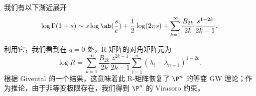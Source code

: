 \begin{lem}
    我们有以下渐近展开
    \[ \log \Gamma(1+s) \sim s \log \ab(\frac{s}{e}) + \frac{1}{2} \log(2\pi s) + \sum_{k=1}^{\infty} \frac{B_{2k}}{2k} \frac{s^{1-2k}}{2k-1}. \]
\end{lem}
利用它，我们看到在 \(q = 0\) 处，R-矩阵的对角矩阵元为
\[ \log R = \sum_{k=1}^{\infty} \frac{B_{2k}}{2k} \frac{z^{2k-1}}{2k-1} \sum_{i =1}^n (\lambda_i - \lambda_{n+1})^{1-2k}. \]
根据 Givental 的一个结果，这意味着此 R-矩阵恢复了 \(\P^n\) 的等变 GW 理论；作为推论，由于非等变极限存在，我们得到 \(\P^n\) 的 Virasoro 约束。
